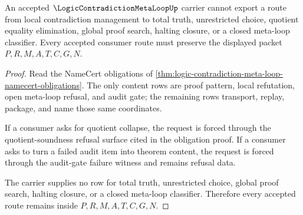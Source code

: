 \begin{theorem}
\label{thm:logic-contradiction-meta-loop-nonescape}
An accepted $\LogicContradictionMetaLoopUp$ carrier cannot export a route from local contradiction management to total truth, unrestricted choice, quotient equality elimination, global proof search, halting closure, or a closed meta-loop classifier. Every accepted consumer route must preserve the displayed packet $P,R,M,A,T,C,G,N$.
\end{theorem}
\begin{proof}
Read the NameCert obligations of \autoref{thm:logic-contradiction-meta-loop-namecert-obligations}. The only content rows are proof pattern, local refutation, open meta-loop refusal, and audit gate; the remaining rows transport, replay, package, and name those same coordinates.

If a consumer asks for quotient collapse, the request is forced through the quotient-soundness refusal surface cited in the obligation proof. If a consumer asks to turn a failed audit item into theorem content, the request is forced through the audit-gate failure witness and remains refusal data.

The carrier supplies no row for total truth, unrestricted choice, global proof search, halting closure, or a closed meta-loop classifier. Therefore every accepted route remains inside $P,R,M,A,T,C,G,N$.
\end{proof}

